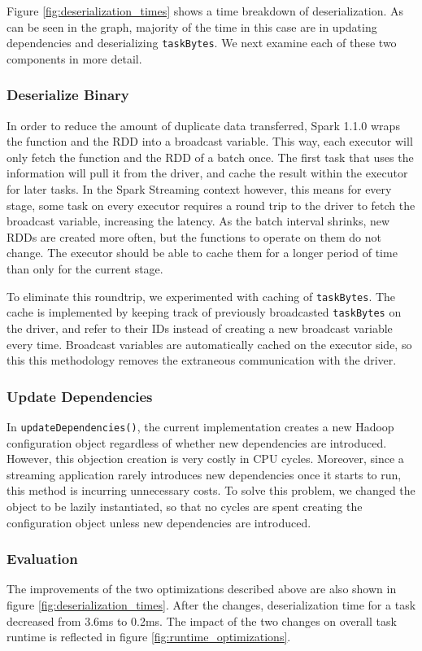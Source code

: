 Figure \ref{fig:deserialization_times} shows a time breakdown of deserialization. As can be seen in the graph, majority of the time in this case are in updating dependencies and deserializing \texttt{taskBytes}. We next examine each of these two components in more detail.

\subsubsection{Deserialize Binary}
In order to reduce the amount of duplicate data transferred, Spark 1.1.0 wraps the function and the RDD into a broadcast variable. This way, each executor will only fetch the function and the RDD of a batch once. The first task that uses the information will pull it from the driver, and cache the result within the executor for later tasks. In the Spark Streaming context however, this means for every stage, some task on every executor requires a round trip to the driver to fetch the broadcast variable, increasing the latency. As the batch interval shrinks, new RDDs are created more often, but the functions to operate on them do not change. The executor should be able to cache them for a longer period of time than only for the current stage.

To eliminate this roundtrip, we experimented with caching of \texttt{taskBytes}. The cache is implemented by keeping track of previously broadcasted \texttt{taskBytes} on the driver, and refer to their IDs instead of creating a new broadcast variable every time. Broadcast variables are automatically cached on the executor side, so this this methodology removes the extraneous communication with the driver.

\subsubsection{Update Dependencies}
In \texttt{updateDependencies()}, the current implementation creates a new Hadoop configuration object regardless of whether new dependencies are introduced. However, this objection creation is very costly in CPU cycles. Moreover, since a streaming application rarely introduces new dependencies once it starts to run, this method is incurring unnecessary costs. To solve this problem, we changed the object to be lazily instantiated, so that no cycles are spent creating the configuration object unless new dependencies are introduced.

\subsubsection{Evaluation}
The improvements of the two optimizations described above are also shown in figure \ref{fig:deserialization_times}. After the changes, deserialization time for a task decreased from 3.6ms to 0.2ms. The impact of the two changes on overall task runtime is reflected in figure \ref{fig:runtime_optimizations}.

